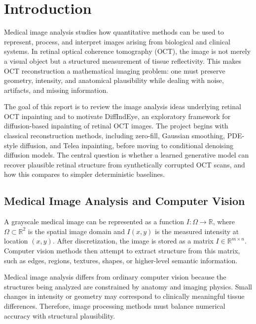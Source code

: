 \documentclass[12pt,oneside]{article}
\newcommand{\R}{\mathbb{R}}
\begin{document}
\newpage
\tableofcontents

\newpage

\section{Introduction}

Medical image analysis studies how quantitative methods can be used to represent, process, and interpret images arising from biological and clinical systems. In retinal optical coherence tomography (OCT), the image is not merely a visual object but a structured measurement of tissue reflectivity. This makes OCT reconstruction a mathematical imaging problem: one must preserve geometry, intensity, and anatomical plausibility while dealing with noise, artifacts, and missing information.

The goal of this report is to review the image analysis ideas underlying retinal OCT inpainting and to motivate DiffIndEye, an exploratory framework for diffusion-based inpainting of retinal OCT images. The project begins with classical reconstruction methods, including zero-fill, Gaussian smoothing, PDE-style diffusion, and Telea inpainting, before moving to conditional denoising diffusion models. The central question is whether a learned generative model can recover plausible retinal structure from synthetically corrupted OCT scans, and how this compares to simpler deterministic baselines.

\subsection*{Medical Image Analysis and Computer Vision}

A grayscale medical image can be represented as a function $I:\Omega \to \R$, where $\Omega \subset \R^2$ is the spatial image domain and $I(x,y)$ is the measured intensity at location $(x,y)$. After discretization, the image is stored as a matrix $I \in \R^{m \times n}$. Computer vision methods then attempt to extract structure from this matrix, such as edges, regions, textures, shapes, or higher-level semantic information.

Medical image analysis differs from ordinary computer vision because the structures being analyzed are constrained by anatomy and imaging physics. Small changes in intensity or geometry may correspond to clinically meaningful tissue differences. Therefore, image processing methods must balance numerical accuracy with structural plausibility.
\end{document}
